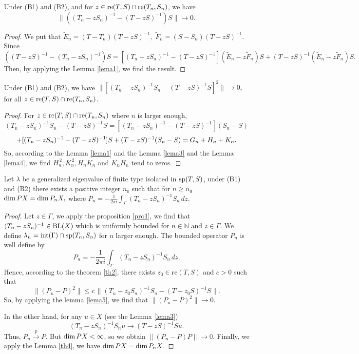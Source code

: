 \documentclass[
11pt,%
tightenlines,%
twoside,%
onecolumn,%
nofloats,%
nobibnotes,%
nofootinbib,%
superscriptaddress,%
noshowpacs,%
centertags]%
{revtex4}
\def\re{\mathop{\rm re}\nolimits}
\def\BL{\mathop{\rm BL}\nolimits}
\def\sp{\mathop{\rm sp}\nolimits}
\def\re{\mathop{\rm re}\nolimits}
\def\dim{\mathop{\rm dim}\nolimits}
\begin{document}
\begin{lemma}\label{lema4}
Under (B1) and (B2), and for $z\in\re(T,S)\cap\re(T_n,S_n)$, we have
\begin{equation*}
     \|\left((T_n-zS_n)^{-1}-(T-zS)^{-1}\right)S\|\rightarrow0.
\end{equation*}
\end{lemma}
\begin{proof}We put that
$
  \widetilde{E}_n=(T-T_n)(T-zS)^{-1},$ $\widetilde{F}_n=(S-S_n)(T-zS)^{-1}.
$
Since
$$
  \left((T-zS)^{-1}-(T_n-zS_n)^{-1}\right)S = [(T_n-zS_n)^{-1}-(T-zS)^{-1}](\widetilde{E}_n-z\widetilde{F}_n)S
  +(T-zS)^{-1}(\widetilde{E}_n-z\widetilde{F}_n)S.
$$
Then, by applying the Lemma \ref{lema1}, we find the result.
\end{proof}
\begin{lemma}\label{lema5}
Under (B1) and (B2), we have
$
    \|\left[(T_n-zS_n)^{-1}S_n-(T-zS)^{-1}S\right]^{2}\|\rightarrow0,
$
for all $z\in\re(T,S)\cap\re(T_n,S_n)$.
\end{lemma}
\begin{proof} For $z\in\re(T,S)\cap\re(T_n,S_n)$ where $n$ is larger enough,
 $$
   (T_n-zS_n)^{-1}S_n-(T-zS)^{-1}S = [(T_n-zS_n)^{-1}-(T-zS)^{-1}](S_n-S)
   $$
   $$
   +[(T_n-zS_n)^{-1}-(T-zS)^{-1}]S +(T-zS)^{-1}(S_n-S)\\ = G_n+H_n+K_n.
$$
 So, according to the Lemma \ref{lema1} and the Lemma
 \ref{lema3} and the Lemma \ref{lema4}, we find $H_n^{\,2},K_n^{\,2}, H_nK_n$ and $K_nH_n$ tend to zeros.
\end{proof}
\begin{theorem}Let $\lambda$ be a generalized eigenvalue of finite type isolated in $\sp(T,S)$,
 under (B1) and (B2) there exists a positive integer $n_0$ such that for $n\geq n_0$
$
    \dim PX=\dim P_nX,
$
where $\displaystyle{P_{n}=-\frac{1}{2\pi i}\int_{\Gamma}(T_n-zS_n)^{-1}S_n\,dz}$.
\end{theorem}
\begin{proof}Let $z\in\Gamma$, we apply the proposition \ref{pro1}, we find that $(T_n-zS_n)^{-1}\in\BL(X)$ which is uniformly bounded for $n\in\mathbb{N}$ and $z\in \Gamma$. We define $\lambda_n=\mbox{int}(\Gamma)\cap\sp(T_n,S_n)$ for $n$ larger enough. The bounded operator $P_n$ is well define by
\begin{equation*}
    P_{n}=-\frac{1}{2\pi i}\int_{\Gamma}(T_n-zS_n)^{-1}S_n\,dz.
\end{equation*}
Hence, according to the theorem \ref{th2}, there exists $z_0\in \mbox{re}(T,S)$ and $c>0$ such that
\begin{equation*}
    \|(P_n-P)^{2}\|\leq c\,\|(T_n-z_0S_n)^{-1}S_n-(T-z_0S)^{-1}S\|.
\end{equation*}
So, by applying the lemma \ref{lema5}, we find that
$\|(P_n-P)^{2}\|\rightarrow0$.

 In the other hand, for any $u\in X$
(see the Lemma \ref{lema3})
\begin{equation*}
    (T_n-zS_n)^{-1}S_nu\rightarrow(T-zS)^{-1}Su.
\end{equation*}
Thus, $P_n\stackrel{p}{\rightarrow}P$. But $\dim PX<\infty$, so we obtain
$
    \|(P_n-P)P\|\rightarrow0.
$ Finally, we apply the Lemma \ref{th4}, we have $\dim PX=\dim
P_nX$.
\end{proof}
\end{document}
